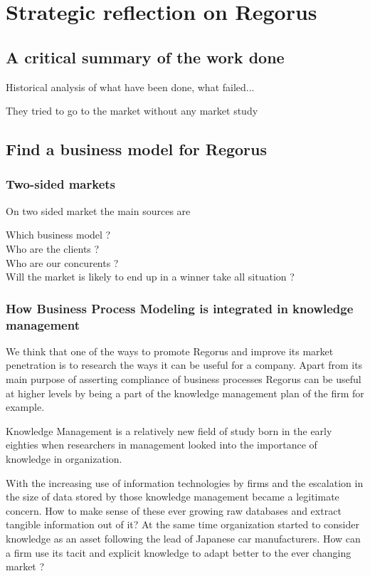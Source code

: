 \documentclass[10pt]{report}
\begin{document}
\newpage
\chapter{Strategic reflection on Regorus}
\section{A critical summary of the work done}
Historical analysis of what have been done, what failed...

They tried to go to the market without any market study

\section{Find a business model for Regorus}

\subsection{Two-sided markets}
On two sided market the main sources are \autocite{ParkerA05} \autocite{eisenmann2006strategies} \autocite{rochet2003platform}

Which business model ?\\
Who are the clients ?\\
Who are our concurents ?\\

Will the market is likely to end up in a winner take all situation ?\\

\subsection{How Business Process Modeling is integrated in knowledge management}

We think that one of the ways to promote Regorus and improve its market penetration is to research the ways it can be useful for a company. Apart from its main purpose of asserting compliance of business processes Regorus can be useful at higher levels by being a part of the knowledge management plan of the firm for example.

Knowledge Management is a relatively new field of study born in the early eighties when researchers in management looked into the importance of knowledge in organization.\autocite{Wiig19971}

With the increasing use of information technologies by firms and the escalation in the size of data stored by those knowledge management became a legitimate concern. How to make sense of these ever growing raw databases and extract tangible information out of it? At the same time organization started to consider knowledge as an asset following the lead of Japanese car manufacturers.\autocite{Koenig08} How can a firm use its tacit and explicit knowledge to adapt better to the ever changing market ?
\end{document}
